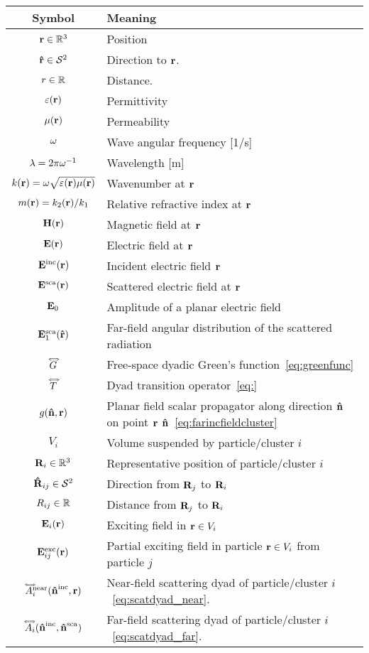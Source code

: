 \begin{table}[]
\footnotesize
\begin{tabular}{cl}
\textbf{Symbol}   & \textbf{Meaning} \\ 
\hline
$\mathbf{r}\in\mathbb{R}^3$ & Position \\
$\mathbf{\hat{r}}\in\mathcal{S}^2$ & Direction to $\mathbf{r}$. \\
$r\in\mathbb{R}$ & Distance. \\
\hline
$\varepsilon(\mathbf{r})$ & Permittivity \\
$\mu(\mathbf{r})$ & Permeability \\
$\omega$ & Wave angular frequency [1/s] \\
$\lambda=2\pi\omega^{-1}$ & Wavelength [m] \\
$k(\mathbf{r})=\omega\sqrt{\varepsilon(\mathbf{r})\mu(\mathbf{r})}$ & Wavenumber at $\mathbf{r}$\\
$m(\mathbf{r})=k_2(\mathbf{r})/k_1$ & Relative refractive index at $\mathbf{r}$ \\
\hline
$\mathbf{H}(\mathbf{r})$ & Magnetic field at $\mathbf{r}$ \\
$\mathbf{E}(\mathbf{r})$   & Electric field at $\mathbf{r}$  \\
$\mathbf{E}^\text{inc}(\mathbf{r})$ & Incident electric field $\mathbf{r}$\\
$\mathbf{E}^\text{sca}(\mathbf{r})$ & Scattered electric field at $\mathbf{r}$ \\ 
$\mathbf{E}_0$ & Amplitude of a planar electric field \\
$\mathbf{E}^\text{sca}_1(\mathbf{\hat{r}})$ & Far-field angular distribution of the scattered radiation  \\
\hline
$\accentset{\Longleftrightarrow}{G}$ & Free-space dyadic Green's function~\eqref{eq:greenfunc} \\
$\accentset{\Longleftrightarrow}{T}$ & Dyad transition operator~\eqref{eq:}\\
$g(\mathbf{\hat{n}},\mathbf{r})$ & Planar field scalar propagator along direction $\mathbf{\hat{n}}$ on point $\mathbf{r}$ $\mathbf{\hat{n}}$~\eqref{eq:farincfieldcluster} \\

\hline
\hline
$V_i$ & Volume suspended by particle/cluster $i$ \\
$\mathbf{R}_i\in\mathbb{R}^3$ & Representative position of particle/cluster $i$ \\
$\mathbf{\hat{R}}_{ij}\in\mathcal{S}^2$ & Direction from $\mathbf{R}_j$ to $\mathbf{R}_i$\\
$R_{ij}\in\mathbb{R}$ & Distance from $\mathbf{R}_j$ to $\mathbf{R}_i$\\
\hline
$\mathbf{E}_i(\mathbf{r})$ & Exciting field in $\mathbf{r}\in V_i$ \\
$\mathbf{E}^\text{exc}_{ij}(\mathbf{r})$ & Partial exciting field in particle $\mathbf{r}\in V_i$ from particle $j$ \\

\hline
$\accentset{\Longleftrightarrow}{A}_i^\text{near}(\mathbf{\hat{n}}^{\text{inc}},\mathbf{r})$ & Near-field scattering dyad of particle/cluster $i$~\eqref{eq:scatdyad_near}. \\
$\accentset{\Longleftrightarrow}{A}_i(\mathbf{\hat{n}}^{\text{inc}},\mathbf{\hat{n}}^{\text{sca}})$ & Far-field scattering dyad of particle/cluster $i$~\eqref{eq:scatdyad_far}. \\

\hline

\end{tabular}
\end{table}




